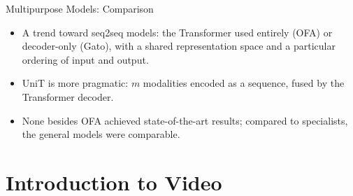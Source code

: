 \begin{frame}{Multipurpose Models: Comparison}
\footnotesize
{}
\normalsize
\begin{itemize}
  \item A trend toward seq2seq models: the Transformer used entirely (OFA) or decoder-only (Gato), with a shared representation space and a particular ordering of input and output.
  \item UniT is more pragmatic: $m$ modalities encoded as a sequence, fused by the Transformer decoder.
  \item None besides OFA achieved state-of-the-art results; compared to specialists, the general models were comparable.
\end{itemize}
\end{frame}

\section{Introduction to Video}

